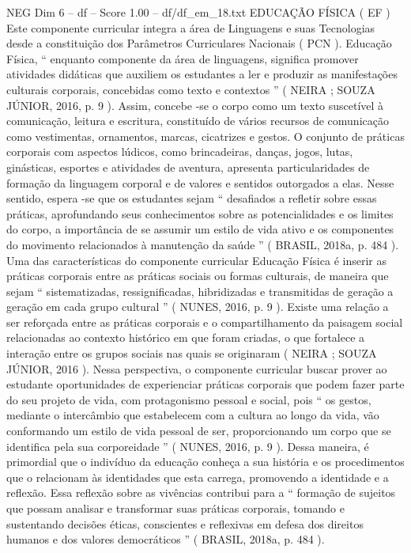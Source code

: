\begin{textsample}{NEG Dim 6 – df – Score 1.00 – df/df\_em\_18.txt}  \label{ex:f6_neg_164}
EDUCAÇÃO FÍSICA ( EF ) Este componente curricular integra a área de Linguagens e suas Tecnologias desde a constituição dos Parâmetros Curriculares Nacionais ( PCN ).
Educação Física, “ enquanto componente da área de linguagens, significa promover atividades didáticas que auxiliem os estudantes a ler e produzir as manifestações culturais corporais, concebidas como texto e contextos ” ( NEIRA ; SOUZA JÚNIOR, 2016, p. 9 ).
Assim, concebe -se o corpo como um texto suscetível à comunicação, leitura e escritura, constituído de vários recursos de comunicação como vestimentas, ornamentos, marcas, cicatrizes e gestos.
O conjunto de práticas corporais com aspectos lúdicos, como brincadeiras, danças, jogos, lutas, ginásticas, esportes e atividades de aventura, apresenta particularidades de formação da linguagem corporal e de valores e sentidos outorgados a elas.
Nesse sentido, espera -se que os estudantes sejam “ desafiados a refletir sobre essas práticas, aprofundando seus conhecimentos sobre as potencialidades e os limites do corpo, a importância de se assumir um estilo de vida ativo e os componentes do movimento relacionados à manutenção da saúde ” ( BRASIL, 2018a, p. 484 ).
Uma das características do componente curricular Educação Física é inserir as práticas corporais entre as práticas sociais ou formas culturais, de maneira que sejam “ sistematizadas, ressignificadas, hibridizadas e transmitidas de geração a geração em cada grupo cultural ” ( NUNES, 2016, p. 9 ).
Existe uma relação a ser reforçada entre as práticas corporais e o compartilhamento da paisagem social relacionadas ao contexto histórico em que foram criadas, o que fortalece a interação entre os grupos sociais nas quais se originaram ( NEIRA ; SOUZA JÚNIOR, 2016 ).
Nessa perspectiva, o componente curricular buscar prover ao estudante oportunidades de experienciar práticas corporais que podem fazer parte do seu projeto de vida, com protagonismo pessoal e social, pois “ os gestos, mediante o intercâmbio que estabelecem com a cultura ao longo da vida, vão conformando um estilo de vida pessoal de ser, proporcionando um corpo que se identifica pela sua corporeidade ” ( NUNES, 2016, p. 9 ).
Dessa maneira, é primordial que o indivíduo da educação conheça a sua história e os procedimentos que o relacionam às identidades que esta carrega, promovendo a identidade e a reflexão.
Essa reflexão sobre as vivências contribui para a “ formação de sujeitos que possam analisar e transformar suas práticas corporais, tomando e sustentando decisões éticas, conscientes e reflexivas em defesa dos direitos humanos e dos valores democráticos ” ( BRASIL, 2018a, p. 484 ).

\end{textsample}

